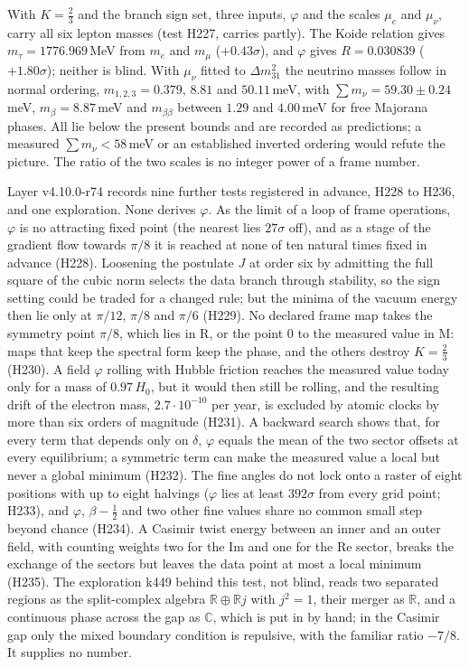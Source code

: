 With $K=\tfrac23$ and the branch sign set, three inputs, $\varphi$ and
the scales $\mu_e$ and $\mu_\nu$, carry all six lepton masses (test H227,
carries partly). The Koide relation gives $m_\tau=1776.969$\,MeV from
$m_e$ and $m_\mu$ ($+0.43\sigma$), and $\varphi$ gives $R=0.030839$
($+1.80\sigma$); neither is blind. With $\mu_\nu$ fitted to
$\Delta m^2_{31}$ the neutrino masses follow in normal ordering,
$m_{1,2,3}=0.379$, $8.81$ and $50.11$\,meV, with
$\sum m_\nu=59.30\pm0.24$\,meV, $m_\beta=8.87$\,meV and $m_{\beta\beta}$
between $1.29$ and $4.00$\,meV for free Majorana phases. All lie below
the present bounds and are recorded as predictions; a measured
$\sum m_\nu<58$\,meV or an established inverted ordering would refute the
picture. The ratio of the two scales is no integer power of a frame
number.

Layer v4.10.0-r74 records nine further tests registered in advance, H228
to H236, and one exploration. None derives $\varphi$. As the limit of a
loop of frame operations, $\varphi$ is no attracting fixed point (the
nearest lies $27\sigma$ off), and as a stage of the gradient flow towards
$\pi/8$ it is reached at none of ten natural times fixed in advance
(H228). Loosening the postulate $J$ at order six by admitting the full
square of the cubic norm selects the data branch through stability, so
the sign setting could be traded for a changed rule; but the minima of
the vacuum energy then lie only at $\pi/12$, $\pi/8$ and $\pi/6$ (H229).
No declared frame map takes the symmetry point $\pi/8$, which lies in R,
or the point $0$ to the measured value in M: maps that keep the spectral
form keep the phase, and the others destroy $K=\tfrac23$ (H230). A field
$\varphi$ rolling with Hubble friction reaches the measured value today
only for a mass of $0.97\,H_0$, but it would then still be rolling, and
the resulting drift of the electron mass, $2.7\cdot10^{-10}$ per year, is
excluded by atomic clocks by more than six orders of magnitude (H231). A
backward search shows that, for every term that depends only on
$\delta$, $\varphi$ equals the mean of the two sector offsets at every
equilibrium; a symmetric term can make the measured value a local but
never a global minimum (H232). The fine angles do not lock onto a raster
of eight positions with up to eight halvings ($\varphi$ lies at least
$392\sigma$ from every grid point; H233), and $\varphi$, $\beta-\tfrac12$
and two other fine values share no common small step beyond chance
(H234). A Casimir twist energy between an inner and an outer field, with
counting weights two for the Im and one for the Re sector, breaks the
exchange of the sectors but leaves the data point at most a local
minimum (H235). The exploration k449 behind this test, not blind, reads
two separated regions as the split-complex algebra $\mathbb R\oplus\mathbb Rj$
with $j^2=1$, their merger as $\mathbb R$, and a continuous phase across
the gap as $\mathbb C$, which is put in by hand; in the Casimir gap only
the mixed boundary condition is repulsive, with the familiar ratio
$-7/8$. It supplies no number.

